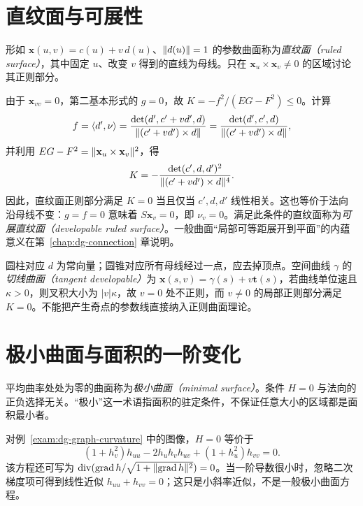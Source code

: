 \section{直纹面与可展性}
\begin{definition}[直纹面]
形如 $\mathbf x(u,v)=c(u)+v\,d(u)$、$\lVert d(u)\rVert=1$ 的参数曲面称为\emph{直纹面（ruled surface）}，其中固定 $u$、改变 $v$ 得到的直线为母线。只在 $\mathbf x_u\times\mathbf x_v\ne0$ 的区域讨论其正则部分。
\end{definition}
由于 $\mathbf x_{vv}=0$，第二基本形式的 $g=0$，故 $K=-f^2/(EG-F^2)\le0$。计算
\[
 f=\langle d',\nu\rangle
 =\frac{\det(d',c'+vd',d)}{\lVert (c'+vd')\times d\rVert}
 =\frac{\det(d',c',d)}{\lVert (c'+vd')\times d\rVert},
\]
并利用 $EG-F^2=\lVert \mathbf x_u\times\mathbf x_v\rVert^2$，得
\begin{equation}
 K=-\frac{\det(c',d,d')^2}{\lVert (c'+vd')\times d\rVert^4}.
 \label{eq:dg-ruled-K}
\end{equation}
因此，直纹面正则部分满足 $K=0$ 当且仅当 $c',d,d'$ 线性相关。这也等价于法向沿母线不变：$g=f=0$ 意味着 $S\mathbf x_v=0$，即 $\nu_v=0$。满足此条件的直纹面称为\emph{可展直纹面（developable ruled surface）}。一般曲面“局部可等距展开到平面”的内蕴意义在第~\ref{chap:dg-connection} 章说明。

圆柱对应 $d$ 为常向量；圆锥对应所有母线经过一点，应去掉顶点。空间曲线 $\gamma$ 的\emph{切线曲面（tangent developable）}为 $\mathbf x(s,v)=\gamma(s)+v\mathbf t(s)$，若曲线单位速且 $\kappa>0$，则叉积大小为 $|v|\kappa$，故 $v=0$ 处不正则，而 $v\ne0$ 的局部正则部分满足 $K=0$。不能把产生奇点的参数线直接纳入正则曲面理论。

\section{极小曲面与面积的一阶变化}
\begin{definition}[极小曲面]
平均曲率处处为零的曲面称为\emph{极小曲面（minimal surface）}。条件 $H=0$ 与法向的正负选择无关。“极小”这一术语指面积的驻定条件，不保证任意大小的区域都是面积最小者。
\end{definition}
对例~\ref{exam:dg-graph-curvature} 中的图像，$H=0$ 等价于
\begin{equation}
 (1+h_v^2)h_{uu}-2h_uh_vh_{uv}+(1+h_u^2)h_{vv}=0.
 \label{eq:dg-minimal-equation}
\end{equation}
该方程还可写为 $\operatorname{div}(\operatorname{grad} h/\sqrt{1+\lVert \operatorname{grad} h\rVert^2})=0$。当一阶导数很小时，忽略二次梯度项可得到线性近似 $h_{uu}+h_{vv}=0$；这只是小斜率近似，不是一般极小曲面方程。

